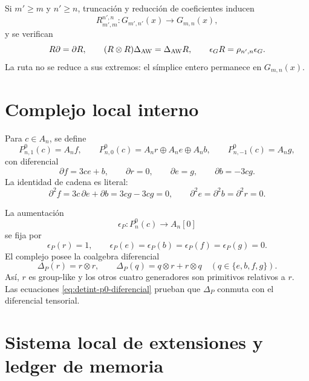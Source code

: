 Si \(m'\ge m\) y \(n'\ge n\), truncación y reducción de coeficientes
inducen
\begin{equation}\label{eq:detint-rmn}
 R_{m',m}^{n',n}:G_{m',n'}(x)\longrightarrow G_{m,n}(x),
\end{equation}
y se verifican
\begin{equation}\label{eq:detint-aw-natural}
 R\partial=\partial R,
 \qquad
 (R\otimes R)\Delta_{\rm AW}=\Delta_{\rm AW}R,
 \qquad
 \epsilon_GR=\rho_{n',n}\epsilon_G.
\end{equation}
La ruta no se reduce a sus extremos: el símplice entero permanece en
\(G_{m,n}(x)\).

\section{Complejo local interno}

Para \(c\in A_n\), se define
\begin{equation}\label{eq:detint-p0-grados}
 P^0_{n,1}(c)=A_nf,
 \qquad
 P^0_{n,0}(c)=A_nr\oplus A_ne\oplus A_nb,
 \qquad
 P^0_{n,-1}(c)=A_ng,
\end{equation}
con diferencial
\begin{equation}\label{eq:detint-p0-diferencial}
 \partial f=3ce+b,
 \qquad
 \partial r=0,
 \qquad
 \partial e=g,
 \qquad
 \partial b=-3cg.
\end{equation}
La identidad de cadena es literal:
\begin{equation}\label{eq:detint-d2}
 \partial^2f=3c\,\partial e+\partial b=3cg-3cg=0,
 \qquad
 \partial^2e=\partial^2b=\partial^2r=0.
\end{equation}

La aumentación
\begin{equation}\label{eq:detint-epsilon-p}
 \epsilon_P:P_n^0(c)\longrightarrow A_n[0]
\end{equation}
se fija por
\[
 \epsilon_P(r)=1,
 \qquad
 \epsilon_P(e)=\epsilon_P(b)=\epsilon_P(f)=\epsilon_P(g)=0.
\]
El complejo posee la coalgebra diferencial
\begin{equation}\label{eq:detint-coalgebra-p}
 \Delta_P(r)=r\otimes r,
 \qquad
 \Delta_P(q)=q\otimes r+r\otimes q
 \quad(q\in\{e,b,f,g\}).
\end{equation}
Así, \(r\) es group-like y los otros cuatro generadores son primitivos
relativos a \(r\). Las ecuaciones
\eqref{eq:detint-p0-diferencial} prueban que \(\Delta_P\) conmuta con el
diferencial tensorial.

\section{Sistema local de extensiones y ledger de memoria}

